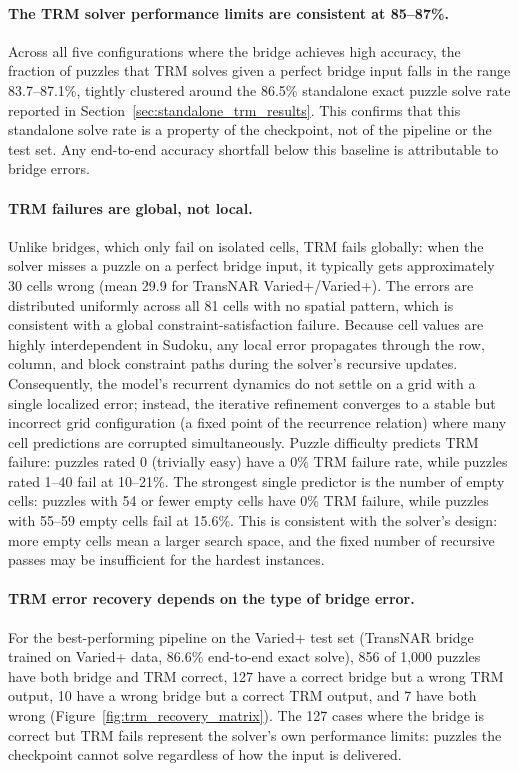 \documentclass[11pt]{article}
\begin{document}
\paragraph{The TRM solver performance limits are consistent at 85--87\%.}
Across all five configurations where the bridge achieves high accuracy, the fraction of puzzles that TRM solves given a perfect bridge input falls in the range 83.7--87.1\%, tightly clustered around the 86.5\% standalone exact puzzle solve rate reported in Section~\ref{sec:standalone_trm_results}.
This confirms that this standalone solve rate is a property of the checkpoint, not of the pipeline or the test set.
Any end-to-end accuracy shortfall below this baseline is attributable to bridge errors.

\paragraph{TRM failures are global, not local.}
Unlike bridges, which only fail on isolated cells, TRM fails globally: when the solver misses a puzzle on a perfect bridge input, it typically gets approximately 30 cells wrong (mean 29.9 for TransNAR Varied+/Varied+).
The errors are distributed uniformly across all 81 cells with no spatial pattern, which is consistent with a global constraint-satisfaction failure. Because cell values are highly interdependent in Sudoku, any local error propagates through the row, column, and block constraint paths during the solver's recursive updates. Consequently, the model's recurrent dynamics do not settle on a grid with a single localized error; instead, the iterative refinement converges to a stable but incorrect grid configuration (a fixed point of the recurrence relation) where many cell predictions are corrupted simultaneously.
Puzzle difficulty predicts TRM failure: puzzles rated 0 (trivially easy) have a 0\% TRM failure rate, while puzzles rated 1--40 fail at 10--21\%.
The strongest single predictor is the number of empty cells: puzzles with 54 or fewer empty cells have 0\% TRM failure, while puzzles with 55--59 empty cells fail at 15.6\%.
This is consistent with the solver's design: more empty cells mean a larger search space, and the fixed number of recursive passes may be insufficient for the hardest instances.



\paragraph{TRM error recovery depends on the type of bridge error.}
For the best-performing pipeline on the Varied+ test set (TransNAR bridge trained on Varied+ data, 86.6\% end-to-end exact solve), 856 of 1,000 puzzles have both bridge and TRM correct, 127 have a correct bridge but a wrong TRM output, 10 have a wrong bridge but a correct TRM output, and 7 have both wrong (Figure~\ref{fig:trm_recovery_matrix}).
The 127 cases where the bridge is correct but TRM fails represent the solver's own performance limits: puzzles the checkpoint cannot solve regardless of how the input is delivered.
\end{document}
